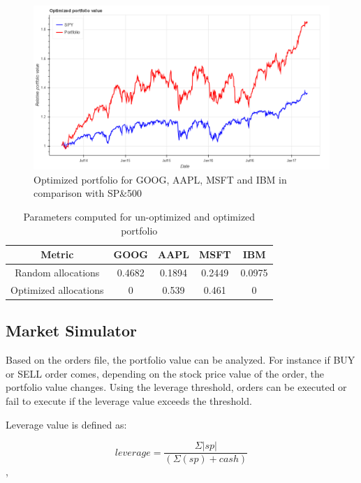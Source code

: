 \documentclass[12pt]{article}
\begin{document}
\begin{figure}[!htbp]
\label{fig:optimized}
\begin{center}
\includegraphics[height=0.5\textheight,width=\textwidth]{optimized.png}
\caption{Optimized portfolio for GOOG, AAPL, MSFT and IBM in comparison with SP\&500}
\end{center}
\end{figure}

\begin{table}
\begin{center}
\begin{tabular} {|c|c|c|c|c|}
\hline \hline
\textbf{Metric} & \textbf{GOOG} & \textbf{AAPL} & \textbf{MSFT} & \textbf{IBM} \\ \hline
Random allocations & 0.4682 & 0.1894 &0.2449 &0.0975 \\ \hline
Optimized allocations & 0 & 0.539 & 0.461 & 0 \\ \hline
\hline
\end{tabular}
\end{center}
\caption{Parameters computed for un-optimized and optimized portfolio}
\end{table}

\subsection{Market Simulator}
\label{sec:sim}
Based on the orders file, the portfolio value can be analyzed. For instance if BUY or SELL order comes, depending on the stock price value of the order, the portfolio value changes. Using the leverage threshold, orders can be executed or fail to execute if the leverage value exceeds the threshold.

Leverage value is defined as:

\[ leverage = \frac{\Sigma|sp|} {(\Sigma(sp) + cash) }\],
\end{document}

